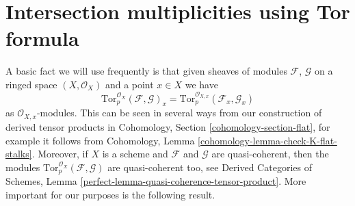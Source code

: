 \section{Intersection multiplicities using Tor formula}
\label{section-tor-formula}

\noindent
A basic fact we will use frequently is that given sheaves of
modules $\mathcal{F}$, $\mathcal{G}$ on a ringed space $(X, \mathcal{O}_X)$
and a point $x \in X$ we have
$$
\text{Tor}_p^{\mathcal{O}_X}(\mathcal{F}, \mathcal{G})_x =
\text{Tor}_p^{\mathcal{O}_{X, x}}(\mathcal{F}_x, \mathcal{G}_x)
$$
as $\mathcal{O}_{X, x}$-modules. This can be seen in several ways
from our construction of derived tensor products in
Cohomology, Section \ref{cohomology-section-flat}, for example it follows from
Cohomology, Lemma \ref{cohomology-lemma-check-K-flat-stalks}.
Moreover, if $X$ is a scheme and $\mathcal{F}$ and $\mathcal{G}$
are quasi-coherent, then the modules
$\text{Tor}_p^{\mathcal{O}_X}(\mathcal{F}, \mathcal{G})$ are
quasi-coherent too, see
Derived Categories of Schemes, Lemma
\ref{perfect-lemma-quasi-coherence-tensor-product}.
More important for our purposes is the following result.

